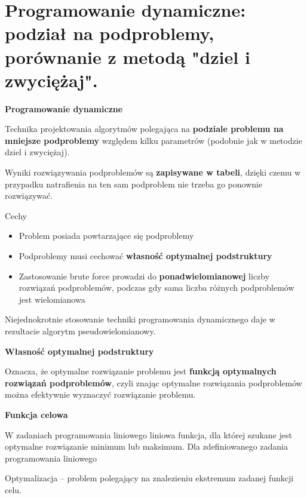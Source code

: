 \documentclass[main.tex]{subfiles}
\begin{document}
    \section{Programowanie dynamiczne: podział na podproblemy, porównanie z metodą "dziel i zwyciężaj".}

    \begin{definition}
        \textbf{Programowanie dynamiczne}

        Technika projektowania algorytmów polegająca na \textbf{podziale problemu na mniejsze podproblemy} względem kilku parametrów (podobnie jak w metodzie dziel i zwyciężaj).

        Wyniki rozwiązywania podproblemów są  \textbf{zapisywane w tabeli}, dzięki czemu w przypadku natrafienia na ten sam podproblem nie trzeba go ponownie rozwiązywać.

        Cechy
        \begin{itemize}
            \item Problem posiada powtarzające się podproblemy
            \item Podproblemy musi cechować \textbf{własność optymalnej podstruktury}
            \item Zastosowanie brute force prowadzi do \textbf{ponadwielomianowej} liczby rozwiązań podproblemów, podczas gdy sama liczba różnych podproblemów jest wielomianowa
        \end{itemize}

        Niejednokrotnie stosowanie techniki programowania dynamicznego daje w rezultacie algorytm pseudowielomianowy.
    \end{definition}

    \begin{definition}
        \textbf{Własność optymalnej podstruktury}

        Oznacza, że optymalne rozwiązanie problemu jest \textbf{funkcją optymalnych rozwiązań podproblemów}, czyli znając optymalne rozwiązania podproblemów można efektywnie wyznaczyć rozwiązanie problemu.
    \end{definition}

    \begin{definition}
        \textbf{Funkcja celowa}

        W zadaniach programowania liniowego liniowa funkcja, dla której szukane jest optymalne rozwiązanie minimum lub maksimum. Dla zdefiniowanego zadania programowania liniowego

        Optymalizacja – problem polegający na znalezieniu ekstremum zadanej funkcji celu.
    \end{definition}
\end{document}
